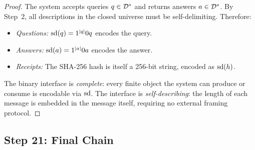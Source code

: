 \begin{proof}
The system accepts queries $q \in \mathcal{D}^*$ and returns answers
$a \in \mathcal{D}^*$.  By Step~2, all descriptions in the closed universe must
be self-delimiting.  Therefore:
\begin{itemize}[nosep]
  \item \emph{Questions:} $\mathrm{sd}(q) = 1^{|q|} 0 q$ encodes the query.
  \item \emph{Answers:} $\mathrm{sd}(a) = 1^{|a|} 0 a$ encodes the answer.
  \item \emph{Receipts:} The SHA-256 hash is itself a 256-bit string,
        encoded as $\mathrm{sd}(h)$.
\end{itemize}

The binary interface is \emph{complete}: every finite object the system
can produce or consume is encodable via $\mathrm{sd}$.  The interface is
\emph{self-describing}: the length of each message is embedded in the
message itself, requiring no external framing protocol.

\end{proof}


\subsection{Step 21: Final Chain}\label{app:step21}

